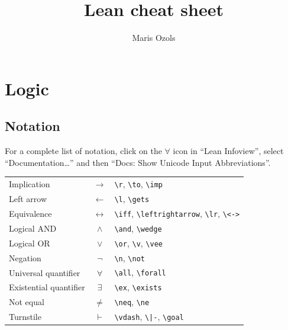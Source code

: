 \documentclass[a4paper]{article}
\begin{document}
\title{Lean cheat sheet}
\author{Maris Ozols}
\maketitle
\tableofcontents
\newpage

\section{Logic}


\subsection*{Notation}

For a complete list of notation, click on the $\forall$ icon in ``Lean Infoview'', select ``Documentation\dots'' and then ``Docs: Show Unicode Input Abbreviations''.

\vspace{10pt}

\begin{tabular}{lcl}
    Implication & $\to$ & \verb|\r|, \verb|\to|, \verb|\imp| \\
    Left arrow & $\gets$ & \verb|\l|, \verb|\gets| \\
    Equivalence & $\leftrightarrow$ & \verb|\iff|, \verb|\leftrightarrow|, \verb|\lr|, \verb|\<->| \\
    Logical AND & $\wedge$ & \verb|\and|, \verb|\wedge| \\
    Logical OR & $\vee$ & \verb|\or|, \verb|\v|, \verb|\vee| \\
    Negation & $\neg$ & \verb|\n|, \verb|\not| \\
    Universal quantifier & $\forall$ & \verb|\all|, \verb|\forall| \\
    Existential quantifier & $\exists$ & \verb|\ex|, \verb|\exists| \\
    Not equal & $\neq$ & \verb|\neq|, \verb|\ne| \\
    Turnstile & $\vdash$ & \verb|\vdash|, \verb:\|-:, \verb|\goal|
\end{tabular}
\end{document}
